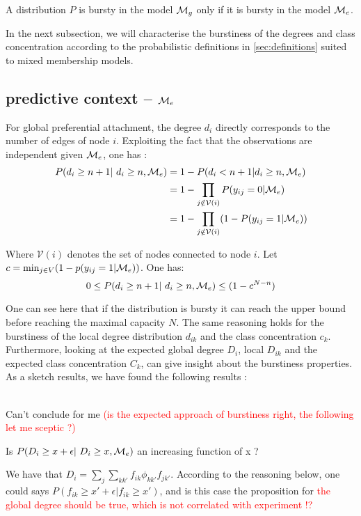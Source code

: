 \begin{proposition} \label{th:me2mg}
    A distribution $P$ is bursty in the model $\mathcal{M}_g$ only if it is bursty in the model $\mathcal{M}_e$.
\end{proposition}

In the next subsection, we will characterise the burstiness of the degrees and class concentration according to the probabilistic definitions in \ref{sec:definitions} suited to mixed membership models.

\subsection{predictive context -- $\mathcal{M}_e$}

For global preferential attachment, the degree $d_i$ directly corresponds to the number of edges of node $i$. Exploiting the fact that the observations are independent given $\mathcal{M}_e$, one has : 
\begin{align*}
    P(d_i \geq n+1 | d_i \geq n, \M_e) &= 1 - P(d_i < n+1 | d_i \geq n, \M_e) \\
        &= 1 - \prod_{j \notin \mathcal{V}(i)} P(y_{ij} = 0 | \M_e) \\
        &= 1 - \prod_{j \notin \mathcal{V}(i)}( 1 -  P(y_{ij} = 1 | \M_e) )
\end{align*}

Where $\mathcal{V}(i)$ denotes the set of nodes connected to node $i$. Let $c=\min_{j \in V}  (1-p(y_{ij} = 1 | \mathcal{M}_e))$. One has: 
\begin{equation} \label{eq:me_upper_bound}
    0 \le P(d_i \geq n+1 | d_i \geq n, \M_e) \leq (1 - c^{N-n})
\end{equation}


One can see here that if the distribution is bursty it can reach the upper bound before reaching the maximal capacity $N$.
The same reasoning holds for the burstiness of the local degree distribution $d_{ik}$ and the class concentration $c_k$.~\\


Furthermore, looking at the expected global degree $D_i$, local $D_{ik}$ and the expected class concentration $C_k$,  can give insight about the burstiness properties. As a sketch results, we have found the following results : 

\begin{proposition}~\\
    Can't conclude for me \textcolor{red}{(is the expected approach of burstiness right, the following let me sceptic ?)}

    Is $P(D_i \geq x +\epsilon | D_i \geq x, \M_e)$ an increasing function of x ? 

    We have that $D_i = \sum_j \sum_{kk'} f_{ik} \phi_{kk'} f_{jk'}$.  According to the reasoning below, one could says $P(f_{ik} \geq x' + \epsilon | f_{ik} \geq x')$, and is this case the proposition for \textcolor{red}{the global degree should be true, which is not correlated with experiment !? }
\end{proposition}

